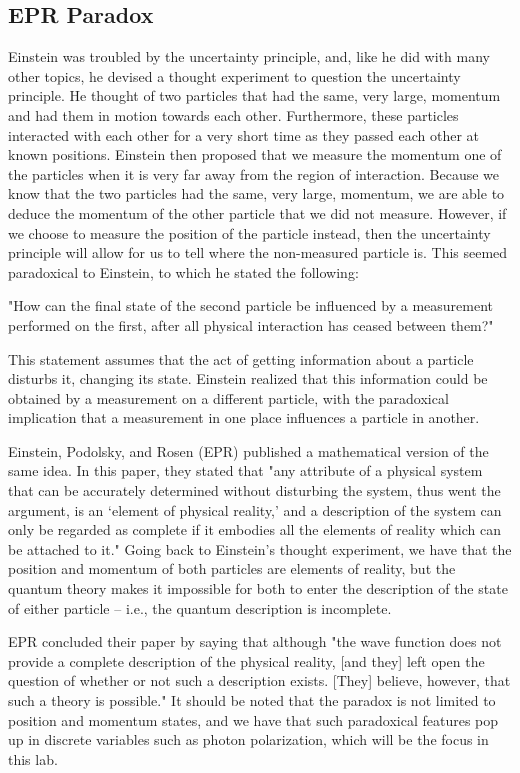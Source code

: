 \documentclass[twocolumn,amsmath,amssymb,pra]{revtex4-2}
\begin{document}
\subsection{EPR Paradox}
Einstein was troubled by the uncertainty principle, and, like he did with many other topics, he devised a thought experiment to question the uncertainty principle. He thought of two particles that had the same, very large, momentum and had them in motion towards each other. Furthermore, these particles interacted with each other for a very short time as they passed each other at known positions. Einstein then proposed that we measure the momentum one of the particles when it is very far away from the region of interaction. Because we know that the two particles had the same, very large, momentum, we are able to deduce the momentum of the other particle that we did not measure. However, if we choose to measure the position of the particle instead, then the uncertainty principle will allow for us to tell where the non-measured particle is. This seemed paradoxical to Einstein, to which he stated the following:
\begin{center}
    "How can the final state of the second particle be influenced by a measurement performed on the first, after all physical interaction has ceased between them?" \cite{D_M}
\end{center}
This statement assumes that the act of getting information about a particle disturbs it, changing its state. Einstein realized that this information could be obtained by a measurement on a different particle, with the paradoxical implication that a measurement in one place influences a particle in another.

Einstein, Podolsky, and Rosen (EPR) published a mathematical version of the same idea. In this paper, they stated that "any attribute of a physical system that can be accurately determined without disturbing the system, thus went the argument, is an ‘element of physical reality,’ and a description of the system can only be regarded as complete if it embodies all the elements of reality which can be attached to it." Going back to Einstein's thought experiment, we have that the position and momentum of both particles are elements of reality, but the quantum theory makes it impossible for both to enter the description of the state of either particle -- i.e., the quantum description is incomplete. 

EPR concluded their paper by saying that although "the wave function does not provide a complete description of the physical reality, [and they] left open the question of whether or not such a description exists. [They] believe, however, that such a theory is possible." \cite{D_M} It should be noted that the paradox is not limited to position and momentum states, and we have that such paradoxical features pop up in discrete variables such as photon polarization, which will be the focus in this lab.
\end{document}

